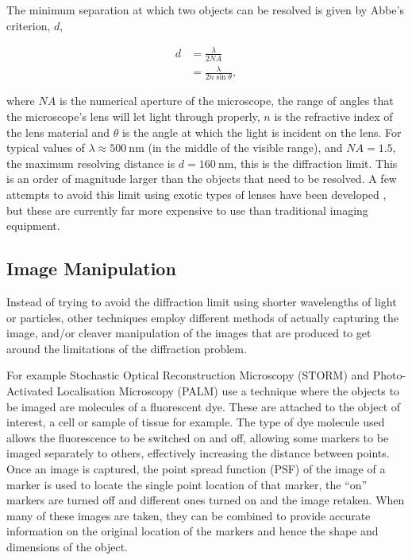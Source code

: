 The minimum separation at which two objects can be resolved is given by Abbe's
criterion, $d$,

\begin{align}
	d &= \frac{\lambda}{2N\!A} \\
	  &= \frac{\lambda}{2n\sin\theta},
\end{align}

where $N\!A$ is the numerical aperture of the microscope, the range of angles
that the microscope's lens will let light through properly, $n$ is the
refractive index of the lens material and $\theta$ is the angle at which the
light is incident on the lens. For typical values of $\lambda \approx
\SI{500}{\nano\metre}$ (in the middle of the visible range), and $N\!A = 1.5$,
the maximum resolving distance is $d = \SI{160}{\nano\meter}$, this is the
diffraction limit. This is an order of magnitude larger than the objects that
need to be resolved. A few attempts to avoid this limit using exotic types of
lenses have been developed \cite{fang2005sub}, but these are currently far more
expensive to use than traditional imaging equipment.

\subsection{Image Manipulation}
\label{sub:image_manipulation}

Instead of trying to avoid the diffraction limit using shorter wavelengths of
light or particles, other techniques employ different methods of actually
capturing the image, and/or cleaver manipulation of the images that are
produced to get around the limitations of the diffraction problem.

For example Stochastic Optical Reconstruction Microscopy (STORM)
\cite{rust2006sub} and Photo-Activated Localisation Microscopy (PALM)
\cite{owen2010palm} use a technique where the objects to be imaged are
molecules of a fluorescent dye. These are attached to the object of interest, a
cell or sample of tissue for example. The type of dye molecule used allows the
fluorescence to be switched on and off, allowing some markers to be imaged
separately to others, effectively increasing the distance between points. Once
an image is captured, the point spread function (PSF) of the image of a marker
is used to locate the single point location of that marker, the ``on'' markers
are turned off and different ones turned on and the image retaken.  When many
of these images are taken, they can be combined to provide accurate information
on the original location of the markers and hence the shape and dimensions of
the object.

